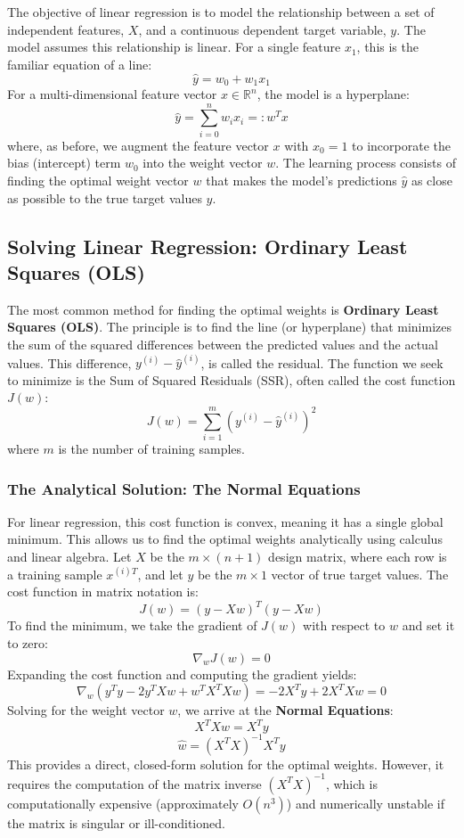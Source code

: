 The objective of linear regression is to model the relationship between a set of independent features, $X$, and a continuous dependent target variable, $y$. The model assumes this relationship is linear. For a single feature $x_1$, this is the familiar equation of a line:
$$ \hat{y} = w_0 + w_1 x_1 $$
For a multi-dimensional feature vector $x \in \mathbb{R}^n$, the model is a hyperplane:
$$ \hat{y} = \sum_{i=0}^{n} w_i x_i =: w^T x $$
where, as before, we augment the feature vector $x$ with $x_0 = 1$ to incorporate the bias (intercept) term $w_0$ into the weight vector $w$. The learning process consists of finding the optimal weight vector $w$ that makes the model's predictions $\hat{y}$ as close as possible to the true target values $y$.

\subsection*{Solving Linear Regression: Ordinary Least Squares (OLS)}
The most common method for finding the optimal weights is \textbf{Ordinary Least Squares (OLS)}. The principle is to find the line (or hyperplane) that minimizes the sum of the squared differences between the predicted values and the actual values. This difference, $y^{(i)} - \hat{y}^{(i)}$, is called the residual. The function we seek to minimize is the Sum of Squared Residuals (SSR), often called the cost function $J(w)$:
$$ J(w) = \sum_{i=1}^{m} (y^{(i)} - \hat{y}^{(i)})^2 $$
where $m$ is the number of training samples.

\subsubsection*{The Analytical Solution: The Normal Equations}
For linear regression, this cost function is convex, meaning it has a single global minimum. This allows us to find the optimal weights analytically using calculus and linear algebra. Let $X$ be the $m \times (n+1)$ design matrix, where each row is a training sample $x^{(i)T}$, and let $y$ be the $m \times 1$ vector of true target values. The cost function in matrix notation is:
$$ J(w) = (y - Xw)^T (y - Xw) $$
To find the minimum, we take the gradient of $J(w)$ with respect to $w$ and set it to zero:
$$ \nabla_w J(w) = 0 $$
Expanding the cost function and computing the gradient yields:
$$ \nabla_w (y^T y - 2y^T Xw + w^T X^T Xw) = -2X^T y + 2X^T Xw = 0 $$
Solving for the weight vector $w$, we arrive at the \textbf{Normal Equations}:
$$ X^T Xw = X^T y $$
$$ \hat{w} = (X^T X)^{-1} X^T y $$
This provides a direct, closed-form solution for the optimal weights. However, it requires the computation of the matrix inverse $(X^T X)^{-1}$, which is computationally expensive (approximately $O(n^3)$) and numerically unstable if the matrix is singular or ill-conditioned.

